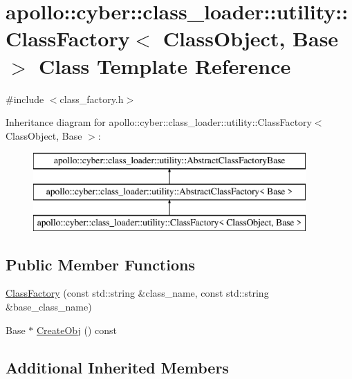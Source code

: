 \hypertarget{classapollo_1_1cyber_1_1class__loader_1_1utility_1_1ClassFactory}{\section{apollo\-:\-:cyber\-:\-:class\-\_\-loader\-:\-:utility\-:\-:Class\-Factory$<$ Class\-Object, Base $>$ Class Template Reference}
\label{classapollo_1_1cyber_1_1class__loader_1_1utility_1_1ClassFactory}
}


{\ttfamily \#include $<$class\-\_\-factory.\-h$>$}

Inheritance diagram for apollo\-:\-:cyber\-:\-:class\-\_\-loader\-:\-:utility\-:\-:Class\-Factory$<$ Class\-Object, Base $>$\-:\begin{figure}[H]
\begin{center}
\leavevmode
\includegraphics[height=3.000000cm]{classapollo_1_1cyber_1_1class__loader_1_1utility_1_1ClassFactory}
\end{center}
\end{figure}
\subsection*{Public Member Functions}
\begin{DoxyCompactItemize}
\item 
\hyperlink{classapollo_1_1cyber_1_1class__loader_1_1utility_1_1ClassFactory_afef5f19f3398b4156864319b42889cda}{Class\-Factory} (const std\-::string \&class\-\_\-name, const std\-::string \&base\-\_\-class\-\_\-name)
\item 
Base $\ast$ \hyperlink{classapollo_1_1cyber_1_1class__loader_1_1utility_1_1ClassFactory_afe170d362f95f097b72fa4de58ee06ca}{Create\-Obj} () const 
\end{DoxyCompactItemize}
\subsection*{Additional Inherited Members}


